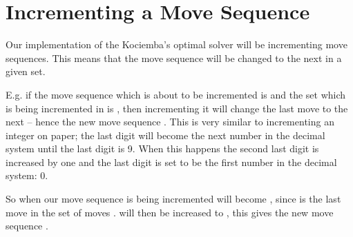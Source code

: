 \section{Incrementing a Move Sequence}
\label{sec:incMoveSequence}
Our implementation of the Kociemba's optimal solver will be incrementing move sequences.
This means that the move sequence will be changed to the next in a given set.

E.g. if the move sequence which is about to be incremented is  and the set which is being incremented in is , then incrementing it will change the last move  to the next  -- hence the new move sequence .
This is very similar to incrementing an integer on paper; the last digit will become the next number in the decimal system until the last digit is 9. When this happens the second last digit is increased by one and the last digit is set to be the first number in the decimal system: 0.

So when our move sequence  is being incremented  will become , since  is the last move in the set of moves .  will then be increased to , this gives the new move sequence .
